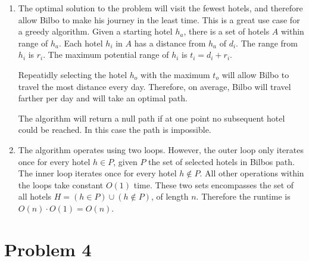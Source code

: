 \documentclass{article}
\begin{document}
\begin{enumerate}[label=(\alph*)]
    \item The optimal solution to the problem will visit the fewest hotels,
        and therefore allow Bilbo to make his journey in the least time.
        This is a great use case for a greedy algorithm.
        Given a starting hotel $h_a$, there is a set of hotels $A$
        within range of $h_a$. Each hotel $h_i$ in $A$ has a distance from
        $h_a$ of $d_i$. The range from $h_i$ is $r_i$. The maximum potential
        range of $h_i$ is $t_i = d_i + r_i$.

        Repeatidly selecting the hotel $h_o$ with the maximum $t_o$ will allow
        Bilbo to travel the most distance every day.
        Therefore, on average, Bilbo will travel farther per day and will
        take an optimal path.

        The algorithm will return a null path if at one point no subsequent
        hotel could be reached. In this case the path is impossible.

    \item The algorithm operates using two loops. However, the outer
        loop only iterates once for every hotel $h \in P$,
        given $P$ the set of selected hotels in Bilbos path.
        The inner loop iterates once for every hotel $h \notin P$.
        All other operations within the loops take constant $O(1)$ time.
        These two sets encompasses the set of all hotels
        $H = (h \in P) \cup (h \notin P)$, of length $n$.
        Therefore the runtime is $O(n) \cdot O(1) = O(n)$.
\end{enumerate}

\pagebreak

\section{Problem 4}
\end{document}
